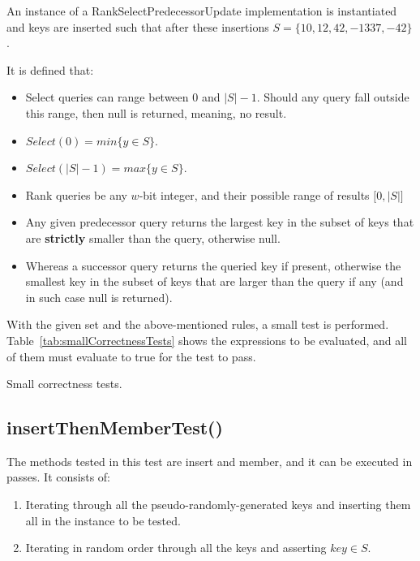 An instance of a {\ttfamily RankSelectPredecessorUpdate} implementation is instantiated and keys are inserted such that after these insertions $S = \{10, 12, 42, -1337, -42\}$.

It is defined that:
\begin{itemize}
    \item
    Select queries can range between $0$ and $|S|-1$. Should any query fall outside this range, then {\ttfamily null} is returned, meaning, no result.
    \item
    $Select(0) = min\{y \in S \}$.
    \item
    $Select(|S|-1) = max\{y \in S\}$.
    \item
    Rank queries be any $w$-bit integer, and their possible range of results $\big[ 0, |S| \big]$
    \item
    Any given predecessor query returns the largest key in the subset of keys that are \textbf{strictly} smaller than the query, otherwise {\ttfamily null}.
    \item
    Whereas a successor query returns the queried key if present, otherwise the smallest key in the subset of keys that are larger than the query if any (and in such case {\ttfamily null} is returned).
\end{itemize}

With the given set and the above-mentioned rules, a small test is performed. Table~\ref{tab:smallCorrectnessTests} shows the expressions to be evaluated, and all of them must evaluate to {\ttfamily true} for the test to pass.

\begin{table}[H]
\centering

\caption[Small correctness tests]{Small correctness tests.}
\label{tab:smallCorrectnessTests}
\end{table}


\subsection{{\ttfamily insertThenMemberTest()}}

The methods tested in this test are {\ttfamily insert} and {\ttfamily member}, and it can be executed in passes. It consists of:
\begin{enumerate}
    \item
    Iterating through all the pseudo-randomly-generated keys and inserting them all in the instance to be tested.
    \item
    Iterating in random order through all the keys and asserting $key \in S$.
\end{enumerate}

